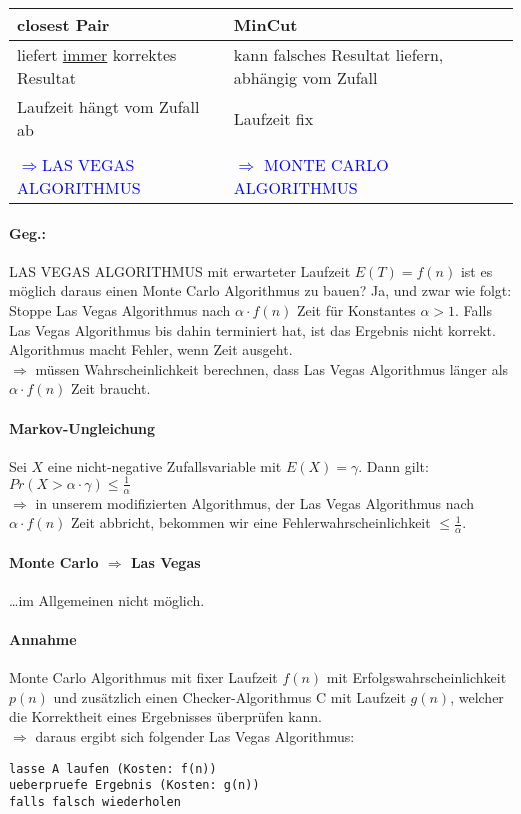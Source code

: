\begin{table}
\centering
\begin{tabular}{l|l}
closest Pair & MinCut \\
\hline
\hline
liefert \underline{immer} korrektes Resultat & kann falsches Resultat liefern, abhängig vom Zufall \\
\hline
Laufzeit hängt vom Zufall ab & Laufzeit fix \\
& \\
\textcolor{blue}{$\Rightarrow$LAS VEGAS ALGORITHMUS} & \textcolor{blue}{$\Rightarrow$ MONTE CARLO ALGORITHMUS} \\
\end{tabular}
\end{table}

\paragraph*{Geg.:} LAS VEGAS ALGORITHMUS mit erwarteter Laufzeit $E(T) = f(n)$ ist es möglich daraus einen Monte Carlo Algorithmus zu bauen? Ja, und zwar wie folgt:
\minisec{} Stoppe Las Vegas Algorithmus nach $\alpha \cdot f(n)$ Zeit für Konstantes $\alpha > 1$. Falls Las Vegas Algorithmus bis dahin terminiert hat, ist das Ergebnis nicht korrekt. Algorithmus macht Fehler, wenn Zeit ausgeht. \\
$\Rightarrow$ müssen Wahrscheinlichkeit berechnen, dass Las Vegas Algorithmus länger als $\alpha \cdot f(n)$ Zeit braucht.

\paragraph*{Markov-Ungleichung} Sei $X$ eine nicht-negative Zufallsvariable mit $E(X) = \gamma$.
Dann gilt: $Pr(X > \alpha \cdot \gamma) \leq \frac{1}{\alpha}$ \\
$\Rightarrow$ in unserem modifizierten Algorithmus, der Las Vegas Algorithmus nach $\alpha \cdot f(n)$ Zeit abbricht, bekommen wir eine Fehlerwahrscheinlichkeit $\leq \frac{1}{\alpha}$.

\paragraph*{Monte Carlo $\Rightarrow$ Las Vegas} \dots im Allgemeinen nicht möglich.
\paragraph*{Annahme} Monte Carlo Algorithmus mit fixer Laufzeit $f(n)$ mit Erfolgswahrscheinlichkeit $p(n)$ und zusätzlich einen Checker-Algorithmus C mit Laufzeit $g(n)$, welcher die Korrektheit eines Ergebnisses überprüfen kann. \\
$\Rightarrow$ daraus ergibt sich folgender Las Vegas Algorithmus:
\begin{lstlisting}
lasse A laufen (Kosten: f(n))
ueberpruefe Ergebnis (Kosten: g(n))
falls falsch wiederholen
\end{lstlisting}

